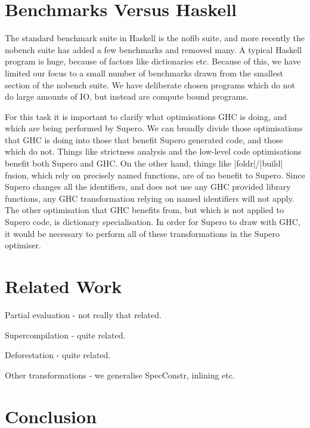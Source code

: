 \documentclass{llncs}
\begin{document}
\section{Benchmarks Versus Haskell}

The standard benchmark suite in Haskell is the nofib suite, and more recently the nobench suite has added a few benchmarks and removed many. A typical Haskell program is huge, because of factors like dictionaries etc. Because of this, we have limited our focus to a small number of benchmarks drawn from the smallest section of the nobench suite. We have deliberate chosen programs which do not do large amounts of IO, but instead are compute bound programs.

For this task it is important to clarify what optimisations GHC is doing, and which are being performed by Supero. We can broadly divide those optimisations that GHC is doing into those that benefit Supero generated code, and those which do not. Things like strictness analysis and the low-level code optimisations benefit both Supero and GHC. On the other hand, things like |foldr|/|build| fusion, which rely on precisely named functions, are of no benefit to Supero. Since Supero changes all the identifiers, and does not use any GHC provided library functions, any GHC transformation relying on named identifiers will not apply. The other optimisation that GHC benefits from, but which is not applied to Supero code, is dictionary specialisation. In order for Supero to draw with GHC, it would be necessary to perform all of these transformations in the Supero optimiser.

\section{Related Work}

Partial evaluation - not really that related.

Supercompilation - quite related.

Deforestation - quite related.

Other transformations - we generalise SpecConstr, inlining etc.

\section{Conclusion}
\end{document}

